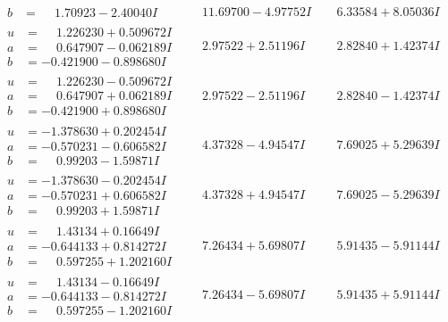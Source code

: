 \documentclass[1p]{elsarticle_modified}
\theoremstyle{definition}
\begin{document}
$$\begin{array}{c|c|c}
\begin{aligned}
b &= \phantom{-}1.70923 - 2.40040 I\end{aligned}
 & \phantom{-}11.69700 - 4.97752 I & \phantom{-}6.33584 + 8.05036 I \\ \hline\begin{aligned}
u &= \phantom{-}1.226230 + 0.509672 I \\
a &= \phantom{-}0.647907 - 0.062189 I \\
b &= -0.421900 - 0.898680 I\end{aligned}
 & \phantom{-}2.97522 + 2.51196 I & \phantom{-}2.82840 + 1.42374 I \\ \hline\begin{aligned}
u &= \phantom{-}1.226230 - 0.509672 I \\
a &= \phantom{-}0.647907 + 0.062189 I \\
b &= -0.421900 + 0.898680 I\end{aligned}
 & \phantom{-}2.97522 - 2.51196 I & \phantom{-}2.82840 - 1.42374 I \\ \hline\begin{aligned}
u &= -1.378630 + 0.202454 I \\
a &= -0.570231 - 0.606582 I \\
b &= \phantom{-}0.99203 - 1.59871 I\end{aligned}
 & \phantom{-}4.37328 - 4.94547 I & \phantom{-}7.69025 + 5.29639 I \\ \hline\begin{aligned}
u &= -1.378630 - 0.202454 I \\
a &= -0.570231 + 0.606582 I \\
b &= \phantom{-}0.99203 + 1.59871 I\end{aligned}
 & \phantom{-}4.37328 + 4.94547 I & \phantom{-}7.69025 - 5.29639 I \\ \hline\begin{aligned}
u &= \phantom{-}1.43134 + 0.16649 I \\
a &= -0.644133 + 0.814272 I \\
b &= \phantom{-}0.597255 + 1.202160 I\end{aligned}
 & \phantom{-}7.26434 + 5.69807 I & \phantom{-}5.91435 - 5.91144 I \\ \hline\begin{aligned}
u &= \phantom{-}1.43134 - 0.16649 I \\
a &= -0.644133 - 0.814272 I \\
b &= \phantom{-}0.597255 - 1.202160 I\end{aligned}
 & \phantom{-}7.26434 - 5.69807 I & \phantom{-}5.91435 + 5.91144 I \\ \hline\begin{aligned}

\end{aligned}
\end{array}$$
\end{document}
